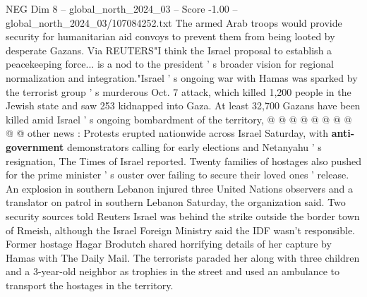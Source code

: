 \begin{textsample}{NEG Dim 8 – global\_north\_2024\_03 – Score -1.00 – global\_north\_2024\_03/107084252.txt}
The armed Arab troops would provide security for humanitarian aid convoys to prevent them from being looted by desperate Gazans.
Via REUTERS"I think the Israel proposal to establish a peacekeeping force... is a nod to the president ' s broader vision for regional normalization and integration."Israel ' s ongoing war with Hamas was sparked by the terrorist group ' s murderous Oct. 7 attack, which killed 1,200 people in the Jewish state and saw 253 kidnapped into Gaza.
At least 32,700 Gazans have been killed amid Israel ' s ongoing bombardment of the territory, @ @ @ @ @ @ @ @ @ @ other news : Protests erupted nationwide across Israel Saturday, with \textbf{anti-government} demonstrators calling for early elections and Netanyahu ' s resignation, The Times of Israel reported.
Twenty families of hostages also pushed for the prime minister ' s ouster over failing to secure their loved ones ' release.
An explosion in southern Lebanon injured three United Nations observers and a translator on patrol in southern Lebanon Saturday, the organization said.
Two security sources told Reuters Israel was behind the strike outside the border town of Rmeish, although the Israel Foreign Ministry said the IDF wasn't responsible.
Former hostage Hagar Brodutch shared horrifying details of her capture by Hamas with The Daily Mail.
The terrorists paraded her along with three children and a 3-year-old neighbor as trophies in the street and used an ambulance to transport the hostages in the territory.

\end{textsample}
